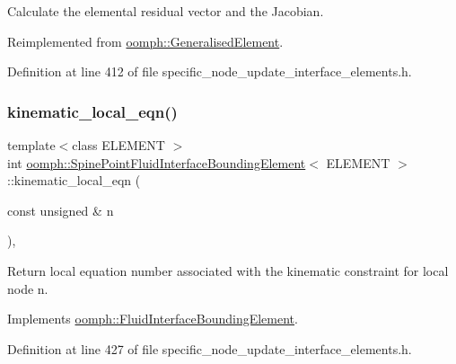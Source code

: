 Calculate the elemental residual vector and the Jacobian. 



Reimplemented from \hyperlink{classoomph_1_1GeneralisedElement_a6ae09fc0d68e4309ac1b03583d252845}{oomph\+::\+Generalised\+Element}.



Definition at line 412 of file specific\+\_\+node\+\_\+update\+\_\+interface\+\_\+elements.\+h.

\mbox{\label{classoomph_1_1SpinePointFluidInterfaceBoundingElement_a7c1c2f31b1d9f9c925889ad199a78947}} 
\subsubsection{\texorpdfstring{kinematic\+\_\+local\+\_\+eqn()}{kinematic\_local\_eqn()}}
{\footnotesize\ttfamily template$<$class E\+L\+E\+M\+E\+NT $>$ \\
int \hyperlink{classoomph_1_1SpinePointFluidInterfaceBoundingElement}{oomph\+::\+Spine\+Point\+Fluid\+Interface\+Bounding\+Element}$<$ E\+L\+E\+M\+E\+NT $>$\+::kinematic\+\_\+local\+\_\+eqn (\begin{DoxyParamCaption}\item[{const unsigned \&}]{n }\end{DoxyParamCaption})\hspace{0.3cm}{\ttfamily [inline]}, {\ttfamily [virtual]}}



Return local equation number associated with the kinematic constraint for local node n. 



Implements \hyperlink{classoomph_1_1FluidInterfaceBoundingElement_a12a0a6d7c3c1c1a5a0f42a57e60eab34}{oomph\+::\+Fluid\+Interface\+Bounding\+Element}.



Definition at line 427 of file specific\+\_\+node\+\_\+update\+\_\+interface\+\_\+elements.\+h.

\mbox{\label{classoomph_1_1SpinePointFluidInterfaceBoundingElement_ac35833173407cde9359c8163a0eba35c}} 
